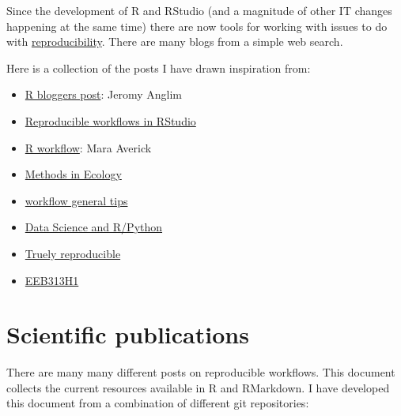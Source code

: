\documentclass[
]{book}
\providecommand{\tightlist}{%
  \setlength{\itemsep}{0pt}\setlength{\parskip}{0pt}}
\theoremstyle{definition}
\theoremstyle{definition}
\theoremstyle{definition}
\theoremstyle{definition}
\theoremstyle{remark}
\begin{document}
Since the development of R and RStudio (and a magnitude of other IT changes happening at the same time) there are now tools for working with issues to do with \href{https://www.nature.com/news/1-500-scientists-lift-the-lid-on-reproducibility-1.19970}{reproducibility}. There are many blogs from a simple web search.

Here is a collection of the posts I have drawn inspiration from:

\begin{itemize}
\tightlist
\item
  \href{https://www.r-bloggers.com/reproducible-research-and-r-workflow/}{R bloggers post}: Jeromy Anglim
\item
  \href{https://cyberhelp.sesync.org/basic-git-lesson/2016/08/25/}{Reproducible workflows in RStudio}
\item
  \href{https://maraaverick.rbind.io/2017/09/r-workflow-fun/}{R workflow}: Mara Averick
\item
  \href{https://methodsblog.com/2016/10/05/reproducibility-with-r/}{Methods in Ecology}
\item
  \href{https://csgillespie.github.io/efficientR/workflow.html}{workflow general tips}
\item
  \href{https://community.rstudio.com/t/data-science-project-template-for-r/3230}{Data Science and R/Python}
\item
  \href{https://timogrossenbacher.ch/2017/07/a-truly-reproducible-r-workflow/}{Truely reproducible}
\item
  \href{https://uoftcoders.github.io/rcourse/lec16-rmarkdown.html}{EEB313H1}
\end{itemize}

\hypertarget{scientific-publications}{%
\section{Scientific publications}\label{scientific-publications}}

There are many many different posts on reproducible workflows. This document collects the current resources available in R and RMarkdown. I have developed this document from a combination of different git repositories:
\end{document}
